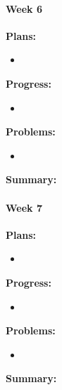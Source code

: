 \paragraph{Week 6}
\begin{adjustwidth}{2.5em}{0pt}
    \vspace{-0.5cm}\textbf{Plans:}
    \vspace{-0.5cm}
    \begin{itemize}
        \item 
    \end{itemize} 
    \vspace{-0.3cm}\textbf{Progress:}
    \vspace{-0.5cm}
    \begin{itemize}
        \item  
    \end{itemize} 
    \vspace{-0.3cm}\textbf{Problems:}
    \vspace{-0.5cm}
    \begin{itemize}
        \item 
    \end{itemize}  
    \vspace{-0.3cm}\noindent\textbf{Summary:}\\
    \noindent 
\end{adjustwidth} 

\paragraph{Week 7}
\begin{adjustwidth}{2.5em}{0pt}
    \vspace{-0.5cm}\textbf{Plans:}
    \vspace{-0.5cm}
    \begin{itemize}
        \item 
    \end{itemize} 
    \vspace{-0.3cm}\textbf{Progress:}
    \vspace{-0.5cm}
    \begin{itemize}
        \item 
    \end{itemize} 
    \vspace{-0.3cm}\textbf{Problems:}
    \vspace{-0.5cm}
    \begin{itemize}
        \item 
    \end{itemize}  
    \vspace{-0.3cm}\noindent\textbf{Summary:}\\
    \noindent 
\end{adjustwidth}